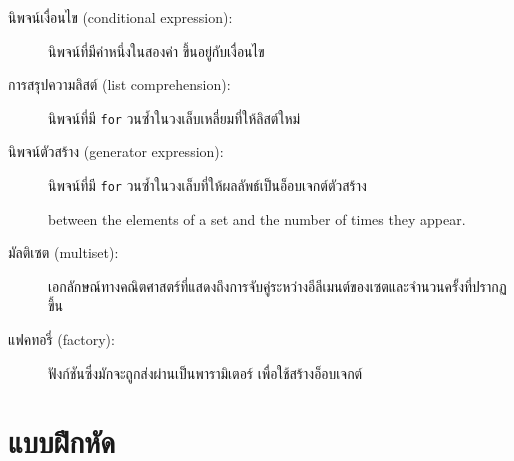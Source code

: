 \begin{description}

\item[นิพจน์เงื่อนไข (conditional expression):] นิพจน์ที่มีค่าหนึ่งในสองค่า ขึ้นอยู่กับเงื่อนไข

\item[การสรุปความลิสต์ (list comprehension):] นิพจน์ที่มี {\tt for} วนซ้ำในวงเล็บเหลี่ยมที่ให้ลิสต์ใหม่

\item[นิพจน์ตัวสร้าง (generator expression):] นิพจน์ที่มี {\tt for}  วนซ้ำในวงเล็บที่ให้ผลลัพธ์เป็นอ็อบเจกต์ตัวสร้าง

between the elements of a set and the number of times they appear.
\item[มัลติเซต (multiset):] เอกลักษณ์ทางคณิตศาสตร์ที่แสดงถึงการจับคู่ระหว่างอีลีเมนต์ของเซตและจำนวนครั้งที่ปรากฏขึ้น

\item[แฟคทอรี่ (factory):] ฟังก์ชันซึ่งมักจะถูกส่งผ่านเป็นพารามิเตอร์ เพื่อใช้สร้างอ็อบเจกต์

\end{description}




\section{แบบฝึกหัด}

